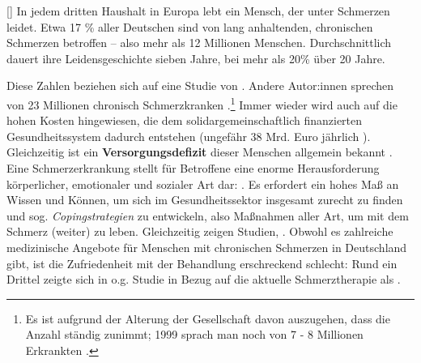 \documentclass[
  twoside,
  parskip=half-,
  paper=176mm:246mm,
  BCOR=14mm,
  DIV=14,
]{scrreprt}
\makeatletter
\renewenvironment*{displayquote}
  {\begingroup\setlength{\leftmargini}{0pt}\csq@getcargs{\csq@bdquote{}{}}}
  {\csq@edquote\endgroup}
\makeatother
\begin{document}
  \begin{displayquote}[{\cite{Schmerzgesellschaft}}]
    In jedem dritten Haushalt in Europa lebt ein Mensch, der unter Schmerzen leidet. Etwa 17 \% aller Deutschen sind von lang anhaltenden, chronischen Schmerzen betroffen – also mehr als 12 Millionen Menschen. Durchschnittlich dauert ihre Leidensgeschichte sieben Jahre, bei mehr als 20\% über 20 Jahre.
  \end{displayquote}
  
  Diese Zahlen beziehen sich auf eine Studie von \textcite{HeftSchmerz28}.
    Andere Autor:innen sprechen von 23 Millionen chronisch Schmerzkranken \autocite[vgl.][4]{wachter}.\footnote{Es ist aufgrund der Alterung der Gesellschaft davon auszugehen, dass die Anzahl ständig zunimmt; 1999 sprach man noch von 7 - 8 Millionen Erkrankten \autocite[vgl.][17]{glier}.}
    Immer wieder wird auch auf die hohen Kosten hingewiesen, die dem solidargemeinschaftlich finanzierten Gesundheitssystem dadurch entstehen (ungefähr 38 Mrd. Euro jährlich \autocite[vgl.][]{Schmerzgesellschaft}).
    Gleichzeitig ist ein \textbf{Versorgungsdefizit} dieser Menschen allgemein bekannt \autocite[vgl.][]{Nachbessern}.
    Eine Schmerzerkrankung stellt für Betroffene eine enorme Herausforderung körperlicher, emotionaler und sozialer Art dar: . Es erfordert ein hohes Maß an Wissen und Können, um sich im Gesundheitssektor insgesamt zurecht zu finden und sog. \textit{Copingstrategien} zu entwickeln, also Maßnahmen aller Art, um mit dem Schmerz (weiter) zu leben.
    Gleichzeitig zeigen Studien, .
    Obwohl es zahlreiche medizinische Angebote für Menschen mit chronischen Schmerzen in Deutschland gibt, ist die Zufriedenheit mit der Behandlung erschreckend schlecht:
    Rund ein Drittel zeigte sich in o.g. Studie in Bezug auf die aktuelle Schmerztherapie als  \autocite[vgl.][]{HeftSchmerz28}.
\end{document}
